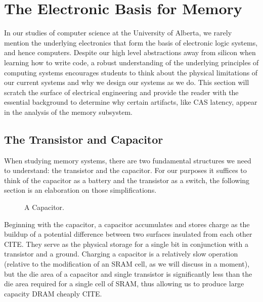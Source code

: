 \chapter{The Electronic Basis for Memory}

In our studies of computer science at the University of Alberta, we rarely mention the underlying electronics that form the basis of electronic logic systems, and hence computers. Despite our high level abstractions away from silicon when learning how to write code, a robust understanding of the underlying principles of computing systems encourages students to think about the physical limitations of our current systems and why we design our systems as we do. This section will scratch the surface of electrical engineering and provide the reader with the essential background to determine why certain artifacts, like CAS latency, appear in the analysis of the memory subsystem.

\section{The Transistor and Capacitor}

When studying memory systems, there are two fundamental structures we need to understand: the transistor and the capacitor. For our purposes it suffices to think of the capacitor as a battery and the transistor as a switch, the following section is an elaboration on those simplifications.

\begin{figure}
  \centering
  \caption{A Capacitor.}
\end{figure}
Beginning with the capacitor, a capacitor accumulates and stores charge as the buildup of a potential difference between two surfaces insulated from each other CITE. They serve as the physical storage for a single bit in conjunction with a transistor and a ground. Charging a capacitor is a relatively slow operation (relative to the modification of an SRAM cell, as we will discuss in a moment), but the die area of a capacitor and single transistor is significantly less than the die area required for a single cell of SRAM, thus allowing us to produce large capacity DRAM cheaply CITE.

